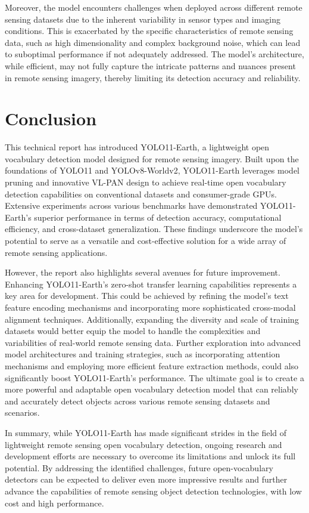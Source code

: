 \documentclass{article}
\begin{document}
Moreover, the model encounters challenges when deployed across different remote sensing datasets due to the 
inherent variability in sensor types and imaging conditions. This is exacerbated by the specific characteristics 
of remote sensing data, such as high dimensionality and complex background noise, which can lead to suboptimal 
performance if not adequately addressed. The model's architecture, while efficient, may not fully capture the 
intricate patterns and nuances present in remote sensing imagery, thereby limiting its detection accuracy and 
reliability.

\section{Conclusion}
This technical report has introduced YOLO11-Earth, a lightweight open vocabulary detection model designed for 
remote sensing imagery. Built upon the foundations of YOLO11 and YOLOv8-Worldv2, YOLO11-Earth leverages model 
pruning and innovative VL-PAN design to achieve real-time open vocabulary detection capabilities on conventional 
datasets and consumer-grade GPUs. Extensive experiments across various benchmarks have demonstrated 
YOLO11-Earth's superior performance in terms of detection accuracy, computational efficiency, and 
cross-dataset generalization. These findings underscore the model's potential to serve as a versatile 
and cost-effective solution for a wide array of remote sensing applications.

However, the report also highlights several avenues for future improvement. Enhancing YOLO11-Earth's zero-shot 
transfer learning capabilities represents a key area for development. This could be achieved by refining 
the model's text feature encoding mechanisms and incorporating more sophisticated cross-modal alignment 
techniques. Additionally, expanding the diversity and scale of training datasets would better equip the model 
to handle the complexities and variabilities of real-world remote sensing data. Further exploration into 
advanced model architectures and training strategies, such as incorporating attention mechanisms and employing 
more efficient feature extraction methods, could also significantly boost YOLO11-Earth's performance. The 
ultimate goal is to create a more powerful and adaptable open vocabulary detection model that can reliably 
and accurately detect objects across various remote sensing datasets and scenarios.

In summary, while YOLO11-Earth has made significant strides in the field of lightweight remote sensing open 
vocabulary detection, ongoing research and development efforts are necessary to overcome its limitations and 
unlock its full potential. By addressing the identified challenges, future open-vocabulary detectors can be 
expected to deliver even more impressive results and further advance the capabilities of remote sensing object 
detection technologies, with low cost and high performance.

\end{document}
